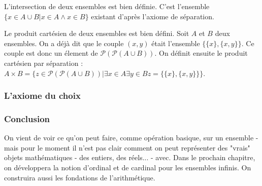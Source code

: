\begin{prop}
	L'intersection de deux ensembles est bien définie.
	\tcblower
	C'est l'ensemble $\{x\in A\cup B| x\in A \land x\in B\}$ existant d'après l'axiome de séparation.
\end{prop}

\begin{prop}
	Le produit cartésien de deux ensembles est bien défini.
	\tcblower
	Soit $A$ et $B$ deux ensembles. On a déjà dit que le couple $(x,y)$ était l'ensemble $\{\{x\}, \{x,y\}\}.$ Ce couple est donc un élement de $\mathcal{P}(\mathcal{P}(A\cup B))$. On définit ensuite le produit cartésien par séparation : $A\times B = \{z\in \mathcal{P}(\mathcal{P}(A\cup B))| \exists x \in A \exists y \in B z=\{\{x\}, \{x,y\}\}\}$.
\end{prop}

\subsubsection{L'axiome du choix}

\subsubsection{Conclusion}
On vient de voir ce qu'on peut faire, comme opération basique, sur un ensemble - mais pour le moment il n'est pas clair comment on peut représenter des "vrais" objets mathématiques - des entiers, des réels... - avec. Dans le prochain chapitre, on développera la notion d'ordinal et de cardinal pour les ensembles infinis. On construira aussi les fondations de l'arithmétique. 